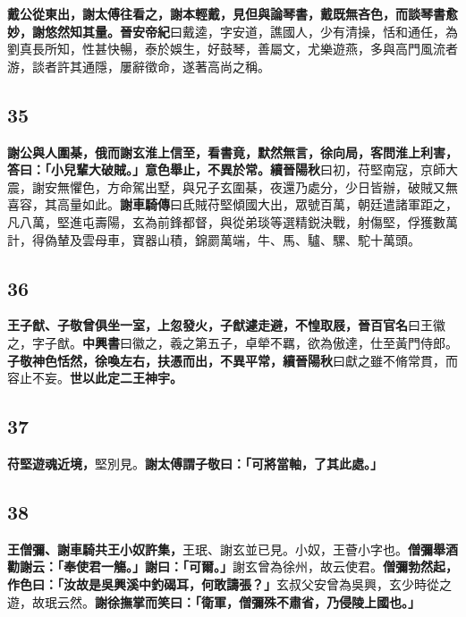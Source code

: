 \textbf{戴公從東出，謝太傅往看之，謝本輕戴，見但與論琴書，戴既無吝色，而談琴書愈妙，謝悠然知其量。}{\footnotesize \textbf{晉安帝紀}曰戴逵，字安道，譙國人，少有清操，恬和通任，為劉真長所知，性甚快暢，泰於娛生，好鼓琴，善屬文，尤樂遊燕，多與高門風流者游，談者許其通隱，屢辭徵命，遂著高尚之稱。}

\subsection*{35}

\textbf{謝公與人圍棊，俄而謝玄淮上信至，看書竟，默然無言，徐向局，客問淮上利害，答曰：「小兒輩大破賊。」意色舉止，不異於常。}{\footnotesize \textbf{續晉陽秋}曰初，苻堅南寇，京師大震，謝安無懼色，方命駕出墅，與兄子玄圍棊，夜還乃處分，少日皆辦，破賊又無喜容，其高量如此。\textbf{謝車騎傳}曰氐賊苻堅傾國大出，眾號百萬，朝廷遣諸軍距之，凡八萬，堅進屯壽陽，玄為前鋒都督，與從弟琰等選精鋭決戰，射傷堅，俘獲數萬計，得偽輦及雲母車，寶器山積，錦罽萬端，牛、馬、驢、騾、駝十萬頭。}

\subsection*{36}

\textbf{王子猷、子敬曾俱坐一室，上忽發火，子猷遽走避，不惶取屐，}{\footnotesize \textbf{晉百官名}曰王徽之，字子猷。\textbf{中興書}曰徽之，羲之第五子，卓犖不羈，欲為傲達，仕至黃門侍郎。}\textbf{子敬神色恬然，徐喚左右，扶憑而出，不異平常，}{\footnotesize \textbf{續晉陽秋}曰獻之雖不脩常貫，而容止不妄。}\textbf{世以此定二王神宇。}

\subsection*{37}

\textbf{苻堅遊魂近境，}{\footnotesize 堅別見。}\textbf{謝太傅謂子敬曰：「可將當軸，了其此處。」}

\subsection*{38}

\textbf{王僧彌、謝車騎共王小奴許集，}{\footnotesize 王珉、謝玄並已見。小奴，王薈小字也。}\textbf{僧彌舉酒勸謝云：「奉使君一觴。」謝曰：「可爾。」}{\footnotesize 謝玄曾為徐州，故云使君。}\textbf{僧彌勃然起，作色曰：「汝故是吳興溪中釣碣耳，何敢譸張？」}{\footnotesize 玄叔父安曾為吳興，玄少時從之遊，故珉云然。}\textbf{謝徐撫掌而笑曰：「衛軍，僧彌殊不肅省，乃侵陵上國也。」}


